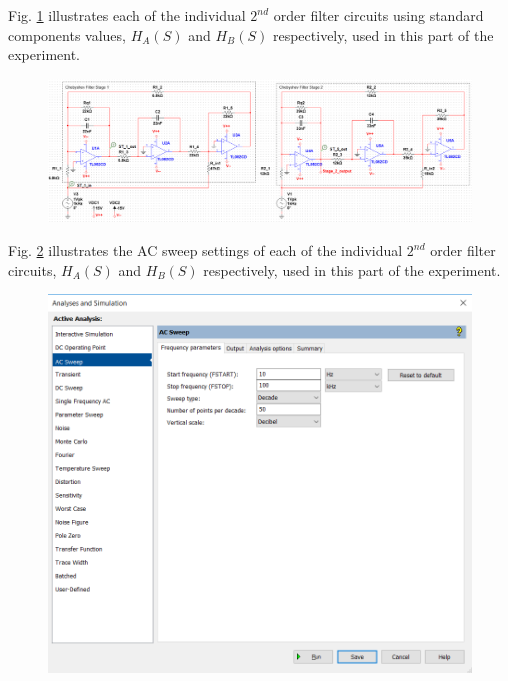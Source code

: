 \documentclass[hidelinks]{article}
\begin{document}
	\pagebreak
	\noindent Fig. \ref{f:circuit4} illustrates each of the individual $2^{nd}$ order filter circuits using standard components values, $H_A(S)$ and $H_B(S)$ respectively, used in this part of the experiment.
	\begin{figure}[htbp]
		\centering
		\includegraphics[width=0.65\textheight]{circuit4.png}
		\label{f:circuit4}
	\end{figure}
	
	\noindent Fig. \ref{f:sim_settings3} illustrates the AC sweep settings of each of the individual $2^{nd}$ order filter circuits, $H_A(S)$ and $H_B(S)$ respectively, used in this part of the experiment.
	\begin{figure}[htbp]
		\centering
		\includegraphics[width=0.65\linewidth]{sim_settings3.png}
		\label{f:sim_settings3}
	\end{figure}	
	
\end{document}
